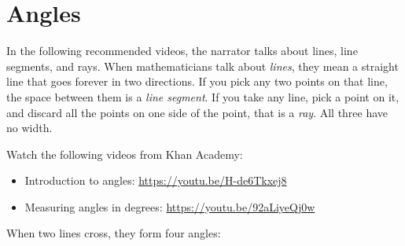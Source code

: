 \chapter{Angles}

In the following recommended videos, the narrator talks about
lines, line segments, and rays. When mathematicians talk about
\emph{lines}, they mean a straight line that goes forever in two 
directions. If you pick any two points on that line, the space between 
them is a \emph{line segment}. If you take any line, pick 
a point on it, and discard all the points on one side of the point, that 
is a \emph{ray}. All three have no width.

\begin{center}
\hspace{10mm}
\hspace{6mm}
\end{center}



Watch the following videos from Khan Academy:
\begin{itemize}
\item Introduction to angles: \url{https://youtu.be/H-de6Tkxej8}
\item Measuring angles in degrees: \url{https://youtu.be/92aLiyeQj0w} 
\end{itemize}

When two lines cross, they form four angles:

